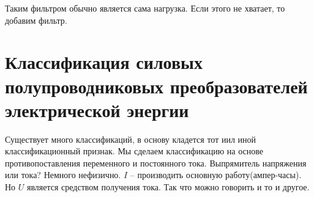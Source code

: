 Таким фильтром обычно является сама нагрузка. Если этого не хватает,
то добавим фильтр.

\section{Классификация силовых полупроводниковых преобразователей
  электрической энергии}

Существует много классификаций, в основу кладется тот иил иной
классификационный признак. Мы сделаем классификацию на основе противопоставления
переменного и постоянного тока. Выпрямитель напряжения или тока?
Немного нефизично. $I$ -- производить основную работу(ампер-часы).
Но $U$ является средством получения тока. Так что можно говорить и то и другое.

\hspace{-3cm}
